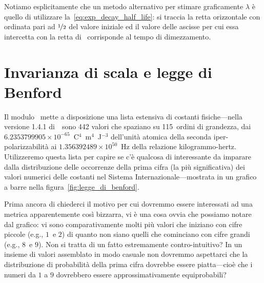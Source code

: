 Notiamo esplicitamente che un metodo alternativo per stimare graficamente $\lambda$
è quello di utilizzare la~\eqref{eq:exp_decay_half_life}: si traccia la retta
orizzontale con ordinata pari ad $\nicefrac{1}{2}$ del valore iniziale ed il valore
delle ascisse per cui essa intercetta con la retta di \bestfit\ corrisponde al
tempo di dimezzamento.


\section{Invarianza di scala e legge di Benford}
\label{sec:legge_di_benford}

Il modulo~ mette a disposizione una lista estensiva
di costanti fisiche---nella versione 1.4.1 di~\scipy\ sono 442 valori che spaziano
su 115~ordini di grandezza, dai $6.2353799905 \times 10^{-65}$~C$^4$~m$^4$~J$^{-3}$
dell'unità atomica della seconda iper-polarizzabilità ai $1.356392489 \times 10^{50}$~Hz
della relazione kilogrammo-hertz. Utilizzeremo questa lista per capire se c'è
qualcosa di interessante da imparare dalla distribuzione delle occorrenze della
prima cifra (la più significativa) dei valori numerici delle costanti nel
Sistema Internazionale---mostrata in un grafico a barre nella figura~\ref{fig:legge_di_benford}.


Prima ancora di chiederci il motivo per cui dovremmo essere interessati ad una metrica
apparentemente così bizzarra, vi è una cosa ovvia che possiamo notare dal grafico:
vi sono comparativamente molti più valori che iniziano con cifre piccole (e.g., $1$~e $2$)
di quanto non siano quelli che cominciano con cifre grandi (e.g., $8$~e $9$).
Non si tratta di un fatto estremamente contro-intuitivo? In un insieme di valori
assemblato in modo casuale non dovremmo aspettarci che la distribuzione di
probabilità della prima cifra dovrebbe essere piatta---cioè che
i numeri da $1$ a $9$ dovrebbero essere approssimativamente equiprobabili?


